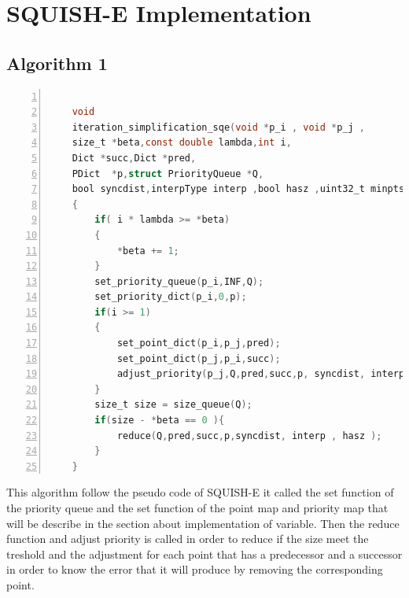\documentclass[twoside,12pt, a4paper]{report}
\begin{document}
\section{SQUISH-E Implementation}


\subsection{Algorithm 1}

\begin{lstlisting}[language=C, % Spécifie le langage du code
	caption={SQUISH-E}, % Légende du listing
	label=lst:squish_c, % Étiquette pour référencer le listing
	numbers=left, 
	numberstyle=\tiny\color{gray}, 
	stepnumber=1, 
	frame=single,
	breaklines=true, 
	postbreak=\mbox{\textcolor{red}{$\hookrightarrow$}\space},
	showstringspaces=false 
	]
	
	void
	iteration_simplification_sqe(void *p_i , void *p_j ,
	size_t *beta,const double lambda,int i,
	Dict *succ,Dict *pred,
	PDict  *p,struct PriorityQueue *Q,
	bool syncdist,interpType interp ,bool hasz ,uint32_t minpts)
	{
		if( i * lambda >= *beta)
		{
			*beta += 1;
		}
		set_priority_queue(p_i,INF,Q);
		set_priority_dict(p_i,0,p);
		if(i >= 1)
		{
			set_point_dict(p_i,p_j,pred);
			set_point_dict(p_j,p_i,succ);
			adjust_priority(p_j,Q,pred,succ,p, syncdist, interp , hasz );
		}
		size_t size = size_queue(Q);
		if(size - *beta == 0 ){
			reduce(Q,pred,succ,p,syncdist, interp , hasz );
		}
	}
\end{lstlisting}
\vspace{1cm}
This algorithm follow the pseudo code of SQUISH-E it called the set function of the priority queue and the set function of the point map and priority map that will be describe in the section about implementation of variable. Then the reduce function and adjust priority is called in order to reduce if the size meet the treshold and the adjustment for each point that has a predecessor and a successor in order to know the error that it will produce by removing the corresponding point. 
\end{document}
